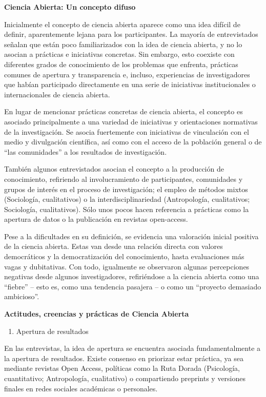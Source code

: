 \documentclass[
  letterpaper,
  DIV=11,
  numbers=noendperiod]{scrreprt}
\providecommand{\tightlist}{%
  \setlength{\itemsep}{0pt}\setlength{\parskip}{0pt}}\usepackage{longtable,booktabs,array}
\begin{document}
\textbf{Ciencia Abierta: Un concepto difuso}

Inicialmente el concepto de ciencia abierta aparece como una idea
difícil de definir, aparentemente lejana para los participantes. La
mayoría de entrevistados señalan que están poco familiarizados con la
idea de ciencia abierta, y no lo asocian a prácticas e iniciativas
concretas. Sin embargo, esto coexiste con diferentes grados de
conocimiento de los problemas que enfrenta, prácticas comunes de
apertura y transparencia e, incluso, experiencias de investigadores que
habían participado directamente en una serie de iniciativas
institucionales o internacionales de ciencia abierta.

En lugar de mencionar prácticas concretas de ciencia abierta, el
concepto es asociado principalmente a una variedad de iniciativas y
orientaciones normativas de la investigación. Se asocia fuertemente con
iniciativas de vinculación con el medio y divulgación científica, así
como con el acceso de la población general o de ``las comunidades'' a
los resultados de investigación.

También algunos entrevistados asocian el concepto a la producción de
conocimiento, refiriendo al involucramiento de participantes,
comunidades y grupos de interés en el proceso de investigación; el
empleo de métodos mixtos (Sociología, cualitativos) o la
interdisciplinariedad (Antropología, cualitativos; Sociología,
cualitativos). Sólo unos pocos hacen referencia a prácticas como la
apertura de datos o la publicación en revistas open-access.

Pese a la dificultades en su definición, se evidencia una valoración
inicial positiva de la ciencia abierta. Estas van desde una relación
directa con valores democráticos y la democratización del conocimiento,
hasta evaluaciones más vagas y dubitativas. Con todo, igualmente se
observaron algunas percepciones negativas desde algunos investigadores,
refiriéndose a la ciencia abierta como una ``fiebre'' -- esto es, como
una tendencia pasajera -- o como un ``proyecto demasiado ambicioso''.

\textbf{Actitudes, creencias y prácticas de Ciencia Abierta}

\begin{enumerate}
\def\labelenumi{\alph{enumi})}
\tightlist
\item
  Apertura de resultados
\end{enumerate}

En las entrevistas, la idea de apertura se encuentra asociada
fundamentalmente a la apertura de resultados. Existe consenso en
priorizar estar práctica, ya sea mediante revistas Open Access,
políticas como la Ruta Dorada (Psicología, cuantitativo; Antropología,
cualitativo) o compartiendo preprints y versiones finales en redes
sociales académicas o personales.
\end{document}
